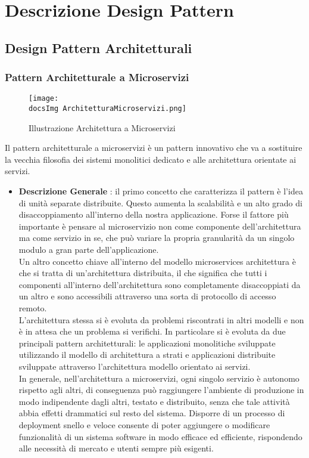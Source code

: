 \section{Descrizione Design Pattern}{
	\subsection{Design Pattern Architetturali}{
			\subsubsection{Pattern Architetturale a Microservizi}{
				\begin{figure}[ht]
					\centering
					\texttt{[image: \\docsImg ArchitetturaMicroservizi.png]}
					\caption{Illustrazione Architettura a Microservizi}
					\label{Illustrazione Architettura a Microservizi}
				\end{figure}
				Il pattern architetturale a microservizi è un pattern innovativo che va a sostituire la vecchia filosofia dei sistemi monolitici dedicato e alle architettura orientate ai servizi.
				\begin{itemize}\itemsep1pt
					\item \textbf{Descrizione Generale} : il primo concetto che caratterizza il pattern è l'idea di unità separate distribuite. Questo aumenta la scalabilità e un alto grado di disaccoppiamento all'interno della nostra applicazione. Forse il fattore più importante è pensare al microservizio non come componente dell'architettura ma come servizio in se, che può variare la propria granularità da un singolo modulo a gran parte dell'applicazione.\\
					Un altro concetto chiave all'interno del modello microservices architettura è che si tratta di un'architettura distribuita, il che significa che tutti i componenti all'interno dell'architettura sono completamente disaccoppiati da un altro e sono accessibili attraverso una sorta di protocollo di accesso remoto.\\
					L'architettura stessa si è evoluta da problemi riscontrati in altri modelli e non è in attesa che un problema si verifichi. In particolare si è evoluta da due principali pattern architetturali: le applicazioni monolitiche sviluppate utilizzando il modello di architettura a strati e applicazioni distribuite sviluppate attraverso l'architettura modello orientato ai servizi.\\
					In generale, nell'architettura a microservizi, ogni singolo servizio è autonomo rispetto agli altri, di conseguenza può raggiungere l’ambiente di produzione in modo indipendente dagli altri, testato e distribuito, senza che tale attività abbia effetti drammatici sul resto del sistema. Disporre di un processo di deployment snello e veloce consente di poter aggiungere o modificare funzionalità di un sistema software in modo efficace ed efficiente, rispondendo alle necessità di mercato e utenti sempre più esigenti.\\

\end{itemize}}}}
